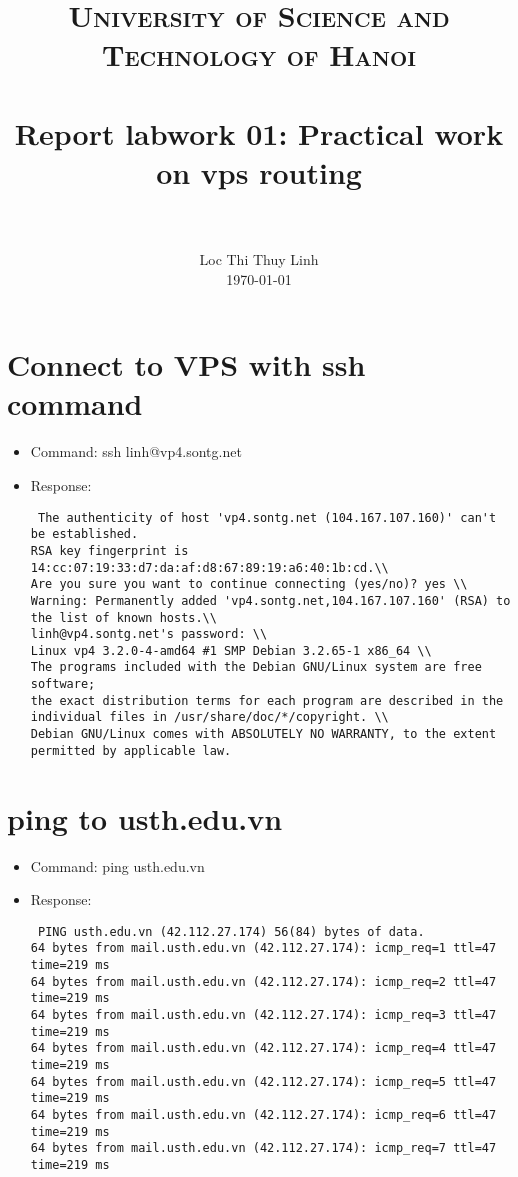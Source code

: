 \documentclass[paper=a4, fontsize=11pt]{scrartcl}
\title{
		\usefont{OT1}{bch}{b}{n}
		\normalfont \normalsize \textsc{University of Science and Technology of Hanoi} \\ [25pt]
		\horrule{0.5pt} \\[0.4cm]
		\huge Report labwork 01: Practical work on vps routing \\
		\horrule{2pt} \\[0.5cm]
}
\author{
		\normalfont 								\normalsize
        Loc Thi Thuy Linh\\[-3pt]		\normalsize
        \today
}
\date{}
\numberwithin{equation}{section}		%
\numberwithin{figure}{section}			%
\numberwithin{table}{section}				%
\begin{document}
\maketitle
\section{Connect to VPS with ssh command}

\begin{itemize}
 \item Command: ssh linh@vp4.sontg.net
 \item Response: 
 \begin{lstlisting}
 The authenticity of host 'vp4.sontg.net (104.167.107.160)' can't be established.
RSA key fingerprint is 14:cc:07:19:33:d7:da:af:d8:67:89:19:a6:40:1b:cd.\\
Are you sure you want to continue connecting (yes/no)? yes \\
Warning: Permanently added 'vp4.sontg.net,104.167.107.160' (RSA) to the list of known hosts.\\
linh@vp4.sontg.net's password: \\
Linux vp4 3.2.0-4-amd64 #1 SMP Debian 3.2.65-1 x86_64 \\
The programs included with the Debian GNU/Linux system are free software;
the exact distribution terms for each program are described in the
individual files in /usr/share/doc/*/copyright. \\
Debian GNU/Linux comes with ABSOLUTELY NO WARRANTY, to the extent
permitted by applicable law.
\end{lstlisting}
\end{itemize}

\section{ping to usth.edu.vn}
\begin{itemize}
 \item Command: ping usth.edu.vn
 \item Response:
 \begin{lstlisting}
 PING usth.edu.vn (42.112.27.174) 56(84) bytes of data.
64 bytes from mail.usth.edu.vn (42.112.27.174): icmp_req=1 ttl=47 time=219 ms
64 bytes from mail.usth.edu.vn (42.112.27.174): icmp_req=2 ttl=47 time=219 ms
64 bytes from mail.usth.edu.vn (42.112.27.174): icmp_req=3 ttl=47 time=219 ms
64 bytes from mail.usth.edu.vn (42.112.27.174): icmp_req=4 ttl=47 time=219 ms
64 bytes from mail.usth.edu.vn (42.112.27.174): icmp_req=5 ttl=47 time=219 ms
64 bytes from mail.usth.edu.vn (42.112.27.174): icmp_req=6 ttl=47 time=219 ms
64 bytes from mail.usth.edu.vn (42.112.27.174): icmp_req=7 ttl=47 time=219 ms
\end{lstlisting}
\end{itemize}
\end{document}
